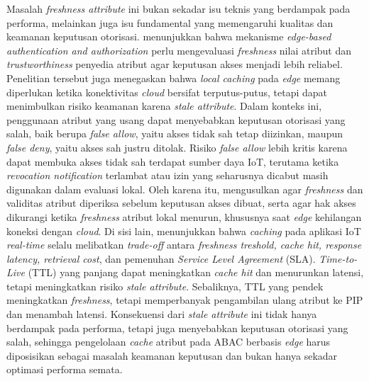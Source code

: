Masalah \textit{freshness attribute} ini bukan sekadar isu teknis yang berdampak pada performa, melainkan juga isu fundamental yang memengaruhi kualitas dan keamanan keputusan otorisasi. \textcite{wang_edge-enabled_2025} menunjukkan bahwa mekanisme \textit{edge-based authentication and authorization} perlu mengevaluasi \textit{freshness} nilai atribut dan \textit{trustworthiness} penyedia atribut agar keputusan akses menjadi lebih reliabel. Penelitian tersebut juga menegaskan bahwa \textit{local caching} pada \textit{edge} memang diperlukan ketika konektivitas \textit{cloud} bersifat terputus-putus, tetapi dapat menimbulkan risiko keamanan karena \textit{stale attribute}. Dalam konteks ini, penggunaan atribut yang usang dapat menyebabkan keputusan otorisasi yang salah, baik berupa \textit{false allow}, yaitu akses tidak sah tetap diizinkan, maupun \textit{false deny}, yaitu akses sah justru ditolak. Risiko \textit{false allow} lebih kritis karena dapat membuka akses tidak sah terdapat sumber daya IoT, terutama ketika \textit{revocation notification} terlambat atau izin yang seharusnya dicabut masih digunakan dalam evaluasi lokal. Oleh karena itu, \textcite{wang_edge-enabled_2025} mengusulkan agar \textit{freshness} dan validitas atribut diperiksa sebelum keputusan akses dibuat, serta agar hak akses dikurangi ketika \textit{freshness} atribut lokal menurun, khususnya saat \textit{edge} kehilangan koneksi dengan \textit{cloud}. Di sisi lain, \textcite{weerasinghe_adaptive_2023} menunjukkan bahwa \textit{caching} pada aplikasi IoT \textit{real-time} selalu melibatkan \textit{trade-off} antara \textit{freshness treshold, cache hit, response latency, retrieval cost}, dan pemenuhan \textit{Service Level Agreement} (SLA). \textit{Time-to-Live} (TTL) yang panjang dapat meningkatkan \textit{cache hit} dan menurunkan latensi, tetapi meningkatkan risiko \textit{stale attribute}. Sebaliknya, TTL yang pendek meningkatkan \textit{freshness}, tetapi memperbanyak pengambilan ulang atribut ke PIP dan menambah latensi. Konsekuensi dari \textit{stale attribute} ini tidak hanya berdampak pada performa, tetapi juga menyebabkan keputusan otorisasi yang salah, sehingga pengelolaan \textit{cache} atribut pada ABAC berbasis \textit{edge} harus diposisikan sebagai masalah keamanan keputusan dan bukan hanya sekadar optimasi performa semata.

